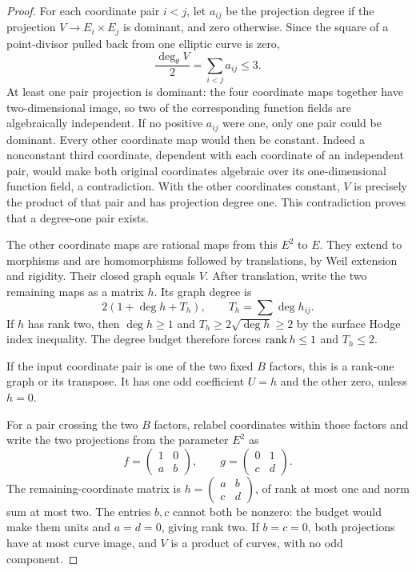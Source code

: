 \begin{proof}
For each coordinate pair $i<j$, let $a_{ij}$ be the projection degree if
the projection $V\to E_i\times E_j$ is dominant, and zero otherwise.
Since the square of a point-divisor pulled back from one elliptic curve
is zero,
\[
 \frac{\deg_\theta V}{2}=\sum_{i<j}a_{ij}\leq3.
\]
At least one pair projection is dominant: the four coordinate maps
together have two-dimensional image, so two of the corresponding
function fields are algebraically independent. If no positive $a_{ij}$
were one, only one pair could be dominant. Every other coordinate map
would then be constant. Indeed a nonconstant third coordinate, dependent
with each coordinate of an independent pair, would make both original
coordinates algebraic over its one-dimensional function field, a
contradiction. With the other coordinates constant, $V$ is precisely the
product of that pair and has projection degree one. This contradiction
proves that a degree-one pair exists.

The other coordinate maps are rational maps from this $E^2$ to $E$.
They extend to morphisms and are homomorphisms followed by translations,
by Weil extension and rigidity. Their closed graph equals $V$. After
translation, write the two remaining maps as a matrix $h$. Its graph
degree is
\[
 2(1+\deg h+T_h),\qquad T_h=\sum\deg h_{ij}.
\]
If $h$ has rank two, then $\deg h\geq1$ and
$T_h\geq2\sqrt{\deg h}\geq2$ by the surface Hodge index inequality.
The degree budget therefore forces $\operatorname{rank} h\leq1$ and $T_h\leq2$.

If the input coordinate pair is one of the two fixed $B$ factors,
this is a rank-one graph or its transpose. It has one odd coefficient
$U=h$ and the other zero, unless $h=0$.

For a pair crossing the two $B$ factors, relabel coordinates within
those factors and write the two projections from the parameter $E^2$ as
\[
 f=\begin{pmatrix}1&0\\ a&b\end{pmatrix},\qquad
 g=\begin{pmatrix}0&1\\ c&d\end{pmatrix}.
\]
The remaining-coordinate matrix is
$h=\left(\begin{smallmatrix}a&b\\c&d\end{smallmatrix}\right)$, of rank
at most one and norm sum at most two. The entries $b,c$ cannot both be
nonzero: the budget would make them units and $a=d=0$, giving rank two.
If $b=c=0$, both projections have at most curve image, and $V$ is a
product of curves, with no odd component.


\end{proof}
